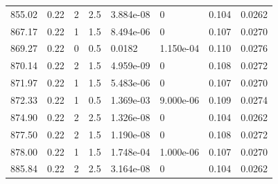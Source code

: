 \documentclass[preview]{standalone}
\begin{document}
{{{{{{\begin{tabular}{L{1.2cm}C{1.2cm} C{0.3cm}C{0.5cm} C{1.4cm}C{1.4cm} C{1.4cm}C{1.4cm}}
  855.02  &  0.22  & 2     & 2.5 &  3.884e-08  & 0  & 0.104 &  0.0262   \\ 
  867.17  &  0.22  & 1     & 1.5 &  8.494e-06  & 0  & 0.107 &  0.0270   \\ 
  869.27  &  0.22  & 0     & 0.5 &  0.0182  & 1.150e-04  & 0.110 &  0.0276   \\ 
  870.14  &  0.22  & 2     & 1.5 &  4.959e-09  & 0  & 0.108 &  0.0272   \\ 
  871.97  &  0.22  & 1     & 1.5 &  5.483e-06  & 0  & 0.107 &  0.0270   \\ 
  872.33  &  0.22  & 1     & 0.5 &  1.369e-03  & 9.000e-06  & 0.109 &  0.0274   \\ 
  874.90  &  0.22  & 2     & 2.5 &  1.326e-08  & 0  & 0.104 &  0.0262   \\ 
  877.50  &  0.22  & 2     & 1.5 &  1.190e-08  & 0  & 0.108 &  0.0272   \\ 
  878.00  &  0.22  & 1     & 1.5 &  1.748e-04  & 1.000e-06  & 0.107 &  0.0270   \\ 
  885.84  &  0.22  & 2     & 2.5 &  3.164e-08  & 0  & 0.104 &  0.0262   \\ 
\hline 
\end{tabular} 

}}}}}}
\end{document}
